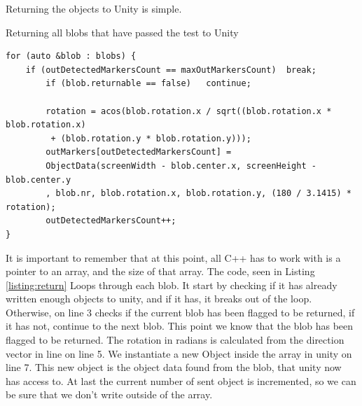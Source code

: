Returning the objects to Unity is simple. 
 \begin{listing}[H]
	\caption{Returning all blobs that have passed the test to Unity}
	\begin{verbatim}
for (auto &blob : blobs) {
	if (outDetectedMarkersCount == maxOutMarkersCount)	break;
		if (blob.returnable == false)	continue;
		
		rotation = acos(blob.rotation.x / sqrt((blob.rotation.x * blob.rotation.x)
		 + (blob.rotation.y * blob.rotation.y)));
		outMarkers[outDetectedMarkersCount] = 
		ObjectData(screenWidth - blob.center.x, screenHeight - blob.center.y
		, blob.nr, blob.rotation.x, blob.rotation.y, (180 / 3.1415) * rotation);
		outDetectedMarkersCount++;
}
	\end{verbatim}
	\label{listing:return}
\end{listing}
It is important to remember that at this point, all C++ has to work with is a pointer to an array, and the size of that array. The code, seen in Listing \ref{listing:return} Loops through each blob. It start by checking if it has already written enough objects to unity, and if it has, it breaks out of the loop. Otherwise, on line 3 checks if the current blob has been flagged to be returned, if it has not, continue to the next blob. This point we know that the blob has been flagged to be returned. The rotation in radians is calculated from the direction vector in line on line 5. We instantiate a new Object inside the array in unity on line 7. This new object is the object data found from the blob, that unity now has access to.  At last the current number of sent object is incremented, so we can be sure that we don't write outside of the array.\\ 
